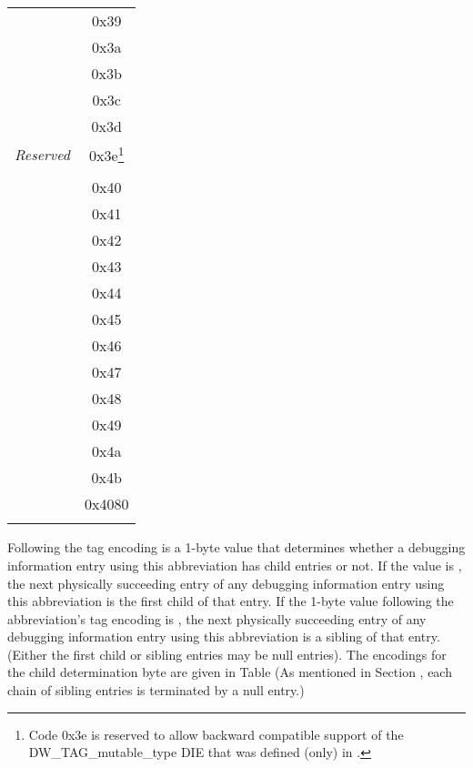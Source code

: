 \begin{centering}
\begin{longtable}{l|c}
\DWTAGnamespace				&0x39  \\
\DWTAGimportedmodule		&0x3a  \\
\DWTAGunspecifiedtype		&0x3b  \\
\DWTAGpartialunit			&0x3c  \\
\DWTAGimportedunit			&0x3d  \\
\textit{Reserved}			&0x3e\footnote{Code 0x3e is reserved to allow backward compatible 
									support of the DW\_TAG\_mutable\_type DIE that was defined 
									(only) in \DWARFVersionIII.} \\
\DWTAGcondition				&\xiiif \\
\DWTAGsharedtype 			& 0x40  \\
\DWTAGtypeunit 				& 0x41  \\
\DWTAGrvaluereferencetype 	& 0x42  \\
\DWTAGtemplatealias 		& 0x43  \\
\DWTAGcoarraytype 			& 0x44  \\
\DWTAGgenericsubrange 		& 0x45  \\
\DWTAGdynamictype 			& 0x46  \\
\DWTAGatomictype 			& 0x47  \\
\DWTAGcallsite 				& 0x48  \\
\DWTAGcallsiteparameter 	& 0x49  \\
\DWTAGskeletonunit 			& 0x4a  \\
\DWTAGimmutabletype 		& 0x4b  \\
\DWTAGlouser				& 0x4080\\
\DWTAGhiuser				& \xffff\\
\end{longtable}
\end{centering}

Following the tag encoding is a 1-byte value that determines
whether a debugging information entry using this abbreviation
has child entries or not. If the value is 
\DWCHILDRENyesTARG,
the next physically succeeding entry of any debugging
information entry using this abbreviation is the first
child of that entry. If the 1-byte value following the
abbreviation\textquoteright s tag encoding is 
\DWCHILDRENnoTARG, the next
physically succeeding entry of any debugging information entry
using this abbreviation is a sibling of that entry. (Either
the first child or sibling entries may be null entries). The
encodings for the child determination byte are given in 
Table 
(As mentioned in 
Section , 
each chain of sibling entries is terminated by a null entry.)

